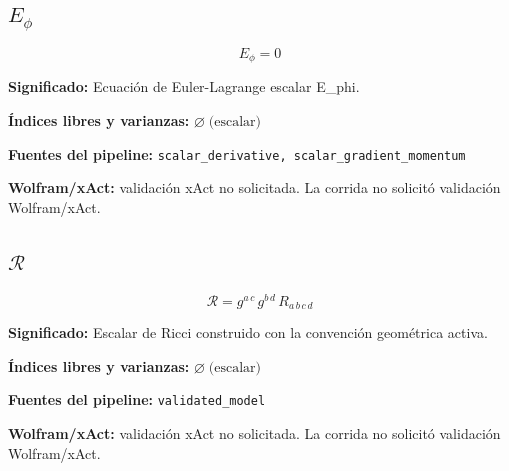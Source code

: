 \documentclass[11pt]{article}
\begin{document}
\subsection*{$ E_{\phi} $}
\begin{dmath*}[breakdepth={5}]
E_{\phi} = 0
\end{dmath*}
\par\vspace{1.2\baselineskip}\noindent
\begin{minipage}{\linewidth}
\textbf{Significado:} Ecuación de Euler-Lagrange escalar E\_phi.\par
\textbf{Índices libres y varianzas:} $ \varnothing\;\text{(escalar)} $\par
\textbf{Fuentes del pipeline:} \texttt{scalar\_derivative, scalar\_gradient\_momentum}\par
\textbf{Wolfram/xAct:} validación xAct no solicitada. La corrida no solicitó validación Wolfram/xAct.\par
\end{minipage}
\subsection*{$ \mathcal{R} $}
\begin{dmath*}[breakdepth={5}]
\mathcal{R} = g{}^{a\,c}\,g{}^{b\,d}\,R{}_{a\,b\,c\,d}
\end{dmath*}
\par\vspace{1.2\baselineskip}\noindent
\begin{minipage}{\linewidth}
\textbf{Significado:} Escalar de Ricci construido con la convención geométrica activa.\par
\textbf{Índices libres y varianzas:} $ \varnothing\;\text{(escalar)} $\par
\textbf{Fuentes del pipeline:} \texttt{validated\_model}\par
\textbf{Wolfram/xAct:} validación xAct no solicitada. La corrida no solicitó validación Wolfram/xAct.\par
\end{minipage}
\end{document}

